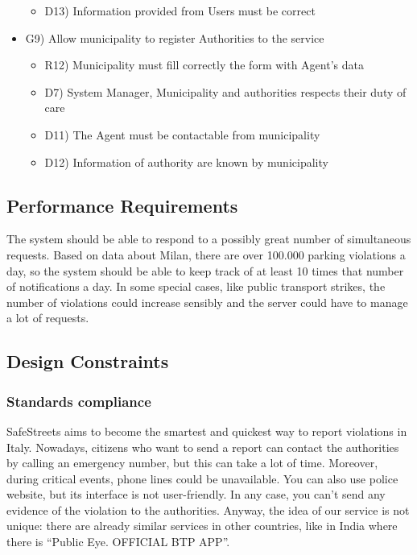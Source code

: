\begin{itemize}
\begin{itemize}
\item D13) Information provided from Users must be correct
\end{itemize}
\item G9) Allow municipality to register Authorities to the service
\begin{itemize}
\item R12) Municipality must fill correctly the form with Agent’s data
\item D7) System Manager, Municipality and authorities respects their duty of care
\item D11) The Agent must be contactable from municipality  
\item D12) Information of authority are known by municipality
\end{itemize}
\end{itemize}

\subsection{Performance Requirements}
The system should be able to respond to a possibly great number of simultaneous requests. Based on 
data about Milan, there are over 100.000 parking violations a day, so the system should be able to keep 
track of at least 10 times that number of notifications a day. In some special cases, like public transport 
strikes, the number of violations could increase sensibly and the server could have to manage a lot of 
requests.

\subsection{Design Constraints}
\subsubsection{Standards compliance }
SafeStreets aims to become the smartest and quickest way to report violations in Italy. 
Nowadays, citizens who want to send a report can contact the authorities by calling an emergency number, 
but this can take a lot of time. Moreover, during critical events, phone lines could be unavailable. 
You can also use police website, but its interface is not user-friendly. In any case, you can’t send any 
evidence of the violation to the authorities. Anyway, the idea of our service is not unique: there are already 
similar services in other countries, like in India where there is “Public Eye. OFFICIAL BTP APP”.
